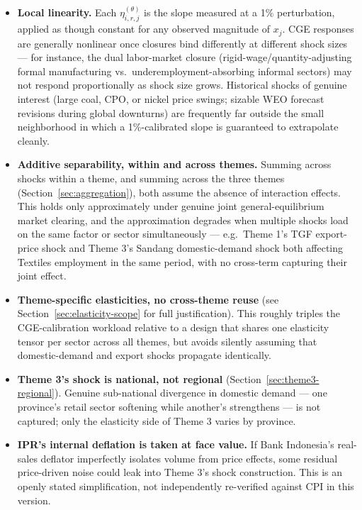 \documentclass[11pt]{article}
\begin{document}
\begin{itemize}
  \item \textbf{Local linearity.} Each $\eta^{(\theta)}_{i,r,j}$ is the slope
  measured at a 1\% perturbation, applied as though constant for any
  observed magnitude of $x_j$. CGE responses are generally nonlinear once
  closures bind differently at different shock sizes --- for instance, the
  dual labor-market closure (rigid-wage/quantity-adjusting formal
  manufacturing vs.\ underemployment-absorbing informal sectors) may not
  respond proportionally as shock size grows. Historical shocks of genuine
  interest (large coal, CPO, or nickel price swings; sizable WEO forecast
  revisions during global downturns) are frequently far outside the small
  neighborhood in which a 1\%-calibrated slope is guaranteed to extrapolate
  cleanly.
  \item \textbf{Additive separability, within and across themes.} Summing
  across shocks within a theme, and summing across the three themes
  (Section~\ref{sec:aggregation}), both assume the absence of interaction
  effects. This holds only approximately under genuine joint
  general-equilibrium market clearing, and the approximation degrades when
  multiple shocks load on the same factor or sector simultaneously --- e.g.\
  Theme 1's TGF export-price shock and Theme 3's Sandang domestic-demand
  shock both affecting Textiles employment in the same period, with no
  cross-term capturing their joint effect.
  \item \textbf{Theme-specific elasticities, no cross-theme reuse} (see
  Section~\ref{sec:elasticity-scope} for full justification). This roughly
  triples the CGE-calibration workload relative to a design that shares one
  elasticity tensor per sector across all themes, but avoids silently
  assuming that domestic-demand and export shocks propagate identically.
  \item \textbf{Theme 3's shock is national, not regional}
  (Section~\ref{sec:theme3-regional}). Genuine sub-national divergence in
  domestic demand --- one province's retail sector softening while
  another's strengthens --- is not captured; only the elasticity side of
  Theme 3 varies by province.
  \item \textbf{IPR's internal deflation is taken at face value.} If Bank
  Indonesia's real-sales deflator imperfectly isolates volume from price
  effects, some residual price-driven noise could leak into Theme 3's shock
  construction. This is an openly stated simplification, not independently
  re-verified against CPI in this version.

\end{itemize}
\end{document}
